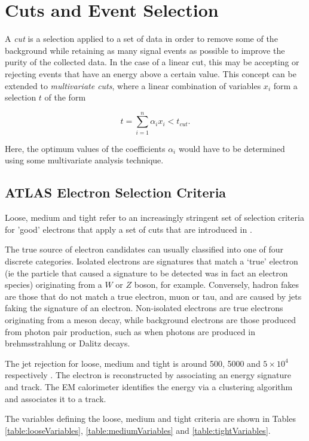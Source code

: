\documentclass{article}
\begin{document}
\section{Cuts and Event Selection}
\label{sec:cuts}
A \textit{cut} is a selection applied to a set of data in order to remove some of the background while retaining as many signal events as possible to improve the purity of the collected data. In the case of a linear cut, this may be accepting or rejecting events that have an energy above a certain value. This concept can be extended to \textit{multivariate cuts}, where a linear combination of variables $x_i$ form a selection $t$ of the form

\begin{equation}
t = \sum_{i=1}^{n}\alpha_i x_i < t_{cut}.
\end{equation}

Here, the optimum values of the coefficients $\alpha_i$ would have to be determined using some multivariate analysis technique.

\subsection{ATLAS Electron Selection Criteria}
\label{sec:cuts_selection}
Loose, medium and tight refer to an increasingly stringent set of selection criteria for 'good' electrons that apply a set of cuts that are introduced in \cite{expectedElectronPerformance}.

The true source of electron candidates can usually classified into one of four discrete categories. 
Isolated electrons are signatures that match a `true' electron (ie the particle that caused a signature to be detected was in fact an electron species) originating from a $W$ or $Z$ boson, for example. Conversely, hadron fakes are those that do not match a true electron, muon or tau, and are caused by jets faking the signature of an electron.
Non-isolated electrons are true electrons originating from a meson decay, while background electrons are those produced from photon pair production, such as when photons are produced in brehmsstrahlung or Dalitz decays.

The jet rejection for loose, medium and tight is around 500, 5000 and $5\times10^4$  respectively \cite{ElectronPerformanceMeasurements}. The electron is reconstructed by associating an energy signature and track. The EM calorimeter identifies the energy via a clustering algorithm and associates it to a track. 

The variables defining the loose, medium and tight criteria are shown in Tables \ref{table:looseVariables}, \ref{table:mediumVariables} and \ref{table:tightVariables}.
\end{document}
